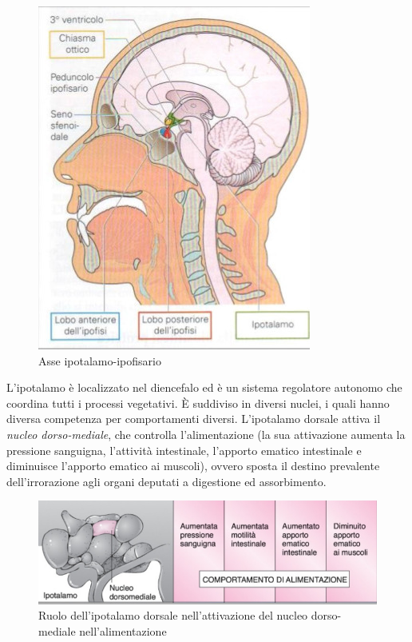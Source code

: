 \documentclass[a4paper,12pt]{article}
\begin{document}
\begin{figure}[H]
\centering
\includegraphics[scale=0.5]{immagine/asse.jpg}
\caption{Asse ipotalamo-ipofisario}
\end{figure}

L'ipotalamo è localizzato nel diencefalo ed è un sistema regolatore autonomo che coordina tutti i processi vegetativi. È suddiviso in diversi nuclei, i quali hanno diversa competenza per comportamenti diversi. L'ipotalamo dorsale attiva  il \emph{nucleo dorso-mediale}, che controlla l'alimentazione (la sua attivazione aumenta la pressione sanguigna, l'attività intestinale, l'apporto ematico intestinale e diminuisce l'apporto ematico ai muscoli), ovvero sposta il destino prevalente dell'irrorazione agli organi deputati a digestione ed assorbimento. 
\begin{figure}[H]
\centering
\includegraphics[scale=0.5]{immagine/alimentazione.jpg}
\caption{Ruolo dell'ipotalamo dorsale nell'attivazione del nucleo dorso-mediale nell'alimentazione}
\end{figure}
\end{document}
